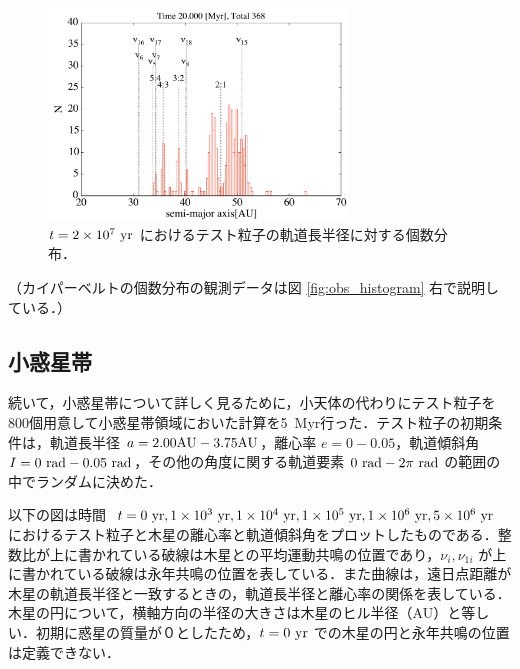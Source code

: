 \documentclass[11pt,a4paper,oneside,onecolumn]{jreport}
\begin{document}
\begin{figure}[H]
\centering
\includegraphics[width=8cm]{./image/kuiper_histogram_20Myr.pdf}
\caption{$t = 2 \times 10^7\ {\rm yr}$ におけるテスト粒子の軌道長半径に対する個数分布．\label{fig:kuiper_histogram_20Myr}}
\end{figure}

（カイパーベルトの個数分布の観測データは図 \ref{fig:obs_histogram} 右で説明している．）
\\


\subsection{小惑星帯}
続いて，小惑星帯について詳しく見るために，小天体の代わりにテスト粒子を800個用意して小惑星帯領域においた計算を5\ Myr行った．テスト粒子の初期条件は，軌道長半径 $a = 2.00 {\rm AU} - 3.75 {\rm AU}$，離心率 $e = 0 - 0.05$，軌道傾斜角 $I = 0\ {\rm rad} - 0.05\ {\rm rad}$，その他の角度に関する軌道要素 $0\ {\rm rad} - 2 \pi\ {\rm rad}$ の範囲の中でランダムに決めた．

以下の図は時間 $t = 0\ {\rm yr}, 1 \times 10^3\ {\rm yr}, 1 \times 10^4\ {\rm yr}, 1 \times 10^5\ {\rm yr}, 1 \times 10^6\ {\rm yr}, 5 \times 10^6\ {\rm yr}$ におけるテスト粒子と木星の離心率と軌道傾斜角をプロットしたものである．整数比が上に書かれている破線は木星との平均運動共鳴の位置であり，$\nu_i, \nu_{1i}$ が上に書かれている破線は永年共鳴の位置を表している．また曲線は，遠日点距離が木星の軌道長半径と一致するときの，軌道長半径と離心率の関係を表している．木星の円について，横軸方向の半径の大きさは木星のヒル半径（AU）と等しい．初期に惑星の質量が０としたため，$t = 0\ {\rm yr}$ での木星の円と永年共鳴の位置は定義できない．
\end{document}
